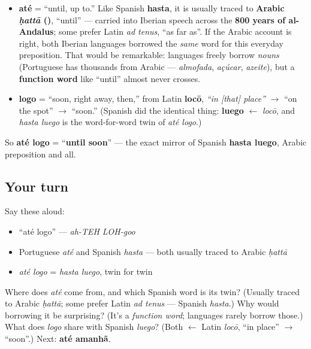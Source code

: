 \begin{cousinweb}
\begin{itemize}
\raggedright
  \item \textbf{até} = \textquotedblleft{}until, up to.\textquotedblright{} Like Spanish \textbf{hasta}, it is usually traced to \textbf{Arabic \emph{ḥattā} ()}, \textquotedblleft{}until\textquotedblright{} — carried into Iberian speech across the \textbf{800 years of al-Andalus}; some prefer Latin \emph{ad tenus}, \textquotedblleft{}as far as\textquotedblright{}. If the Arabic account is right, both Iberian languages borrowed the \emph{same} word for this everyday preposition. That would be remarkable: languages freely borrow \emph{nouns} (Portuguese has thousands from Arabic — \emph{almofada}, \emph{açúcar}, \emph{azeite}), but a \textbf{function word} like \textquotedblleft{}until\textquotedblright{} almost never crosses.
  \item \textbf{logo} = \textquotedblleft{}soon, right away, then,\textquotedblright{} from Latin \textbf{locō}, \emph{\textquotedblleft{}in {[}that{]} place\textquotedblright{}} $\to$ \textquotedblleft{}on the spot\textquotedblright{} $\to$ \textquotedblleft{}soon.\textquotedblright{} (Spanish did the identical thing: \textbf{luego} $\leftarrow$ \emph{locō}, and \emph{hasta luego} is the word-for-word twin of \emph{até logo}.)
\end{itemize}

So \textbf{até logo} = \textquotedblleft{}\textbf{until soon}\textquotedblright{} — the exact mirror of Spanish \textbf{hasta luego}, Arabic preposition and all.
\end{cousinweb}

\subsection*{Your turn}
Say these aloud:

\begin{itemize}
\raggedright
  \item \textquotedblleft{}até logo\textquotedblright{} — \emph{ah-TEH LOH-goo}
  \item Portuguese \emph{até} and Spanish \emph{hasta} — both usually traced to Arabic \emph{ḥattā}
  \item \emph{até logo} = \emph{hasta luego}, twin for twin
\end{itemize}

\begin{tcolorbox}[breakable,colback=teal!4,colframe=teal!35!black,title={Before you move on}]
Where does \emph{até} come from, and which Spanish word is its twin? (Usually traced to Arabic \emph{ḥattā}; some prefer Latin \emph{ad tenus} — Spanish \emph{hasta}.) Why would borrowing it be surprising? (It's a \emph{function word}; languages rarely borrow those.) What does \emph{logo} share with Spanish \emph{luego}? (Both $\leftarrow$ Latin \emph{locō}, \textquotedblleft{}in place\textquotedblright{} $\to$ \textquotedblleft{}soon\textquotedblright{}.) Next: \textbf{até amanhã}.
\end{tcolorbox}
